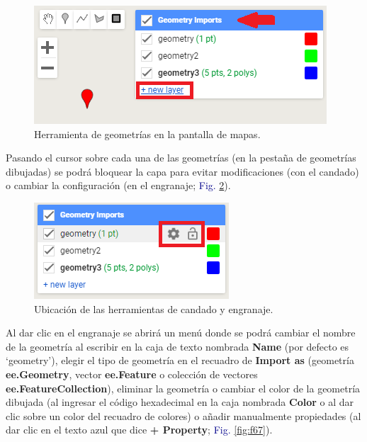 \documentclass[
  12pt,
  letterpaper,
  twoside]{book}
\newcommand\boldpurple[1]{\textcolor{darkpurple}{\textbf{#1}}}
\begin{document}
\begin{figure}[H]

{\centering \includegraphics[width=0.8\linewidth]{Img/nuevaGeo} 

}

\caption{Herramienta de geometrías en la pantalla de mapas.}\label{fig:f65}
\end{figure}

Pasando el cursor sobre cada una de las geometrías (en la pestaña de geometrías dibujadas) se podrá bloquear la capa para evitar modificaciones (con el candado) o cambiar la configuración (en el engranaje; \textcolor{darkblue}{Fig.} \ref{fig:f66}).

\begin{figure}[H]

{\centering \includegraphics[width=0.6\linewidth]{Img/dibujarGeo} 

}

\caption{Ubicación de las herramientas de candado y engranaje.}\label{fig:f66}
\end{figure}

Al dar clic en el engranaje se abrirá un menú donde se podrá cambiar el nombre de la geometría al escribir en la caja de texto nombrada \textbf{Name} (por defecto es `geometry'), elegir el tipo de geometría en el recuadro de \textbf{Import as} (geometría \boldpurple{ee.Geometry}, vector \boldpurple{ee.Feature} o colección de vectores \boldpurple{ee.FeatureCollection}), eliminar la geometría o cambiar el color de la geometría dibujada (al ingresar el código hexadecimal en la caja nombrada \textbf{Color} o al dar clic sobre un color del recuadro de colores) o añadir manualmente propiedades (al dar clic en el texto azul que dice \textbf{+ Property}; \textcolor{darkblue}{Fig.} \ref{fig:f67}).
\end{document}
